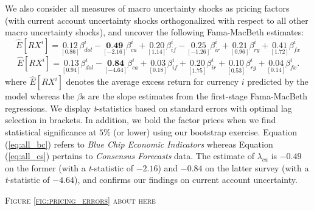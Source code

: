 We also consider all measures of macro uncertainty shocks as pricing factors (with current account uncertainty shocks orthogonalized with respect to all other macro uncertainty shocks), and uncover the following Fama-MacBeth estimates:
\begin{equation} \label{eq:all_bc}
\widehat{E}[RX^{i}] =
\underset{[0.86]}{0.12} \beta_{dol}^{i} -
\underset{[-2.16]}{\textbf{0.49}} \beta_{ca}^{i} +
\underset{[1.14]}{0.20} \beta_{if}^{i} -
\underset{[-1.26]}{0.25} \beta_{ir}^{i} +
\underset{[0.96]}{0.21} \beta_{rg}^{i} +
\underset{[1.72]}{0.41} \beta_{fx}^{i}
\end{equation}
\begin{equation} \label{eq:all_cs}
\widehat{E}[RX^{i}] =
\underset{[0.94]}{0.13}  \beta_{dol}^{i} -
\underset{[-4.64]}{\textbf{0.84}} \beta_{ca}^{i} +
\underset{[0.18]}{0.03}  \beta_{if}^{i} +
\underset{[1.75]}{0.20}  \beta_{ir}^{i} +
\underset{[0.53]}{0.10}  \beta_{rg}^{i} +
\underset{[0.14]}{0.04}  \beta_{fx}^{i}.
\end{equation}
where $\widehat{E}[RX^{i}]$ denotes the average excess return for currency $i$ predicted by the model whereas the $\beta$s are the slope estimates from the first-stage Fama-MacBeth regressions. We display \emph{t}-statistics based on \citet{newey_west1987} standard errors with \citet{andrews1991} optimal lag selection in brackets. In addition, we bold the factor prices when we find statistical significance at $5\%$ (or lower) using our bootstrap exercise. Equation (\ref{eq:all_bc}) refers to \emph{Blue Chip Economic Indicators} whereas Equation (\ref{eq:all_cs}) pertains to \emph{Consensus Forecasts} data. The estimate of $\lambda_{ca}$ is $-0.49$ on the former (with a \emph{t}-statistic of $-2.16$) and $-0.84$ on the latter survey (with a \emph{t}-statistic of $-4.64$), and confirms our findings on current account uncertainty.

\begin{center}
	\textsc{Figure \ref{fig:pricing_errors} about here}
\end{center}


